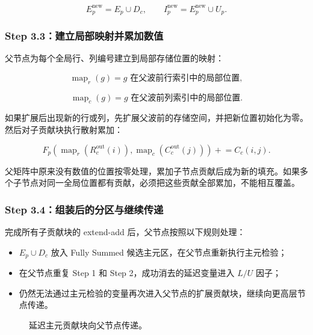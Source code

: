 \[
E_p^{\mathrm{new}}=E_p\cup D_c,
\qquad
I_p^{\mathrm{new}}=E_p^{\mathrm{new}}\cup U_p.
\]

\subsubsection{Step 3.3：建立局部映射并累加数值}

父节点为每个全局行、列编号建立到局部存储位置的映射：

\[
\operatorname{map}_r(g)
=g\text{ 在父波前行索引中的局部位置},
\]

\[
\operatorname{map}_c(g)
=g\text{ 在父波前列索引中的局部位置}.
\]

如果扩展后出现新的行或列，先扩展父波前的存储空间，并把新位置初始化为零。然后对子贡献块执行散射累加：

\[
F_p\!\left(
\operatorname{map}_r(R_c^{\mathrm{out}}(i)),
\operatorname{map}_c(C_c^{\mathrm{out}}(j))
\right)
\mathrel{+}=C_c(i,j).
\]

父矩阵中原来没有数值的位置按零处理，累加子节点贡献后成为新的填充。如果多个子节点对同一全局位置都有贡献，必须把这些贡献全部累加，不能相互覆盖。

\subsubsection{Step 3.4：组装后的分区与继续传递}

完成所有子贡献块的 extend-add 后，父节点按照以下规则处理：

\begin{itemize}
  \item $E_p\cup D_c$ 放入 Fully Summed 候选主元区，在父节点重新执行主元检验；
  \item 在父节点重复 Step 1 和 Step 2，成功消去的延迟变量进入 $L/U$ 因子；
  \item 仍然无法通过主元检验的变量再次进入父节点的扩展贡献块，继续向更高层节点传递。
\end{itemize}

\begin{figure}[htbp]
\centering
{}
\caption{延迟主元贡献块向父节点传递。}
\label{fig:appendix-a-extend-add}
\end{figure}

